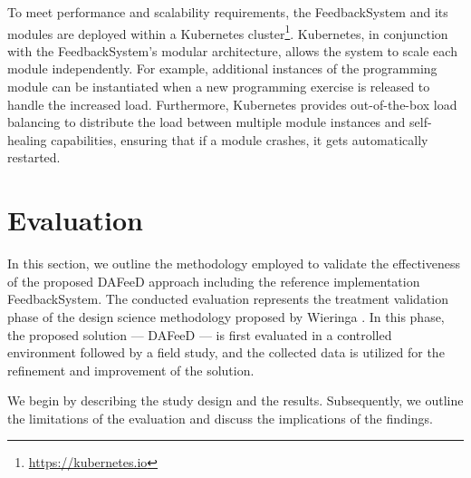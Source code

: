 \documentclass[sigconf,screen,review,anonymous]{acmart}
\begin{document}
To meet performance and scalability requirements, the FeedbackSystem and its modules are deployed within a Kubernetes cluster\footnote{\url{https://kubernetes.io}}.
Kubernetes, in conjunction with the FeedbackSystem's modular architecture, allows the system to scale each module independently.
For example, additional instances of the programming module can be instantiated when a new programming exercise is released to handle the increased load.
Furthermore, Kubernetes provides out-of-the-box load balancing to distribute the load between multiple module instances and self-healing capabilities, ensuring that if a module crashes, it gets automatically restarted.

\section{Evaluation} %
\label{sec:evaluation}

In this section, we outline the methodology employed to validate the effectiveness of the proposed DAFeeD approach including the reference implementation FeedbackSystem.
The conducted evaluation represents the treatment validation phase of the design science methodology proposed by Wieringa \cite{wieringa:2014:DesignScienceMethodologya}.
In this phase, the proposed solution — DAFeeD — is first evaluated in a controlled environment followed by a field study, and the collected data is utilized for the refinement and improvement of the solution.

We begin by describing the study design and the results.
Subsequently, we outline the limitations of the evaluation and discuss the implications of the findings.




\end{document}
